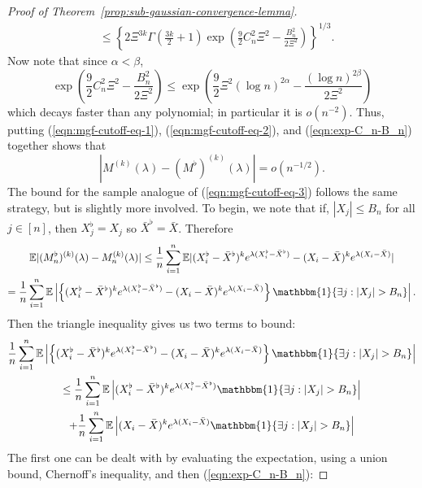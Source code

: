 \documentclass{article}
\theoremstyle{definition}
\newcommand{\E}{\mathbb{E}}
\newcommand{\1}{\mathbbm{1}}
\begin{document}
\begin{proof}[Proof of Theorem~\ref{prop:sub-gaussian-convergence-lemma}]
\begin{align}
        &\leq \left\{2\Xi^{3k}\Gamma\left(\frac{3k}{2}+1\right)\exp\left(\frac92C_n^2\Xi^2-\frac{B_n^2}{2\Xi^2}\right)\right\}^{1/3}. \label{eqn:mgf-cutoff-eq-2}
    \end{align}
    Now note that since $\alpha < \beta$, 
    \begin{equation}
\exp\left(\frac92C_n^2\Xi^2-\frac{B_n^2}{2\Xi^2}\right) \leq  \exp\left(\frac92\Xi^2(\log n)^{2\alpha}-\frac{(\log n)^{2\beta}}{2\Xi^2}\right)
        \label{eqn:exp-C_n-B_n}
    \end{equation}
    which decays faster than any polynomial; in particular it is $o(n^{-2})$. 
    Thus, putting (\ref{eqn:mgf-cutoff-eq-1}), (\ref{eqn:mgf-cutoff-eq-2}), and (\ref{eqn:exp-C_n-B_n}) together shows that 
    \begin{equation}
        |M^{(k)}(\lambda) - (M^\flat)^{(k)}(\lambda)| = o(n^{-1/2}).
        \label{eqn:mgf-cutoff-eq-3}
    \end{equation}
    The bound for the sample analogue of (\ref{eqn:mgf-cutoff-eq-3}) follows the same strategy, but is slightly more involved. To begin, we note that if, $|X_j| \leq B_n$ for all $j \in [n]$, then $X^\flat_j = X_j$ so  $\bar X^\flat = \bar X$. Therefore 
    \begin{multline}
        \E |(M_n^\flat)^{(k)}(\lambda) - M_n^{(k)}(\lambda)|\leq \frac1n\sum_{i=1}^n \E|(X^\flat_i - \bar X^\flat)^ke^{\lambda (X^\flat_i - \bar X^\flat)} - (X_i - \bar X)^ke^{\lambda (X_i - \bar X)}| \\ = \frac1n\sum_{i=1}^n\E\left|\left\{(X^\flat_i - \bar X^\flat)^ke^{\lambda (X^\flat_i - \bar X^\flat)} - (X_i - \bar X)^ke^{\lambda (X_i - \bar X)}\right\} \1\{\exists j:|X_j| > B_n\}\right|.
        \label{eqn:emgf-cutoff-1}
    \end{multline}
    Then the triangle inequality gives us two terms to bound:
    \begin{multline}
        \frac1n\sum_{i=1}^n\E\left|\left\{(X^\flat_i - \bar X^\flat)^ke^{\lambda (X^\flat_i - \bar X^\flat)} - (X_i - \bar X)^ke^{\lambda (X_i - \bar X)}\right\} \1\{\exists j:|X_j| > B_n\}\right| \\
        \leq \frac1n\sum_{i=1}^n \E\left|(X^\flat_i - \bar X^\flat)^ke^{\lambda (X_i^\flat - \bar X^\flat)}\1\{\exists j: |X_j| > B_n\}\right|\\  + \frac1n\sum_{i=1}^n \E\left|(X_i - \bar X)^ke^{\lambda (X_i - \bar X)}\1\{\exists j: |X_j| > B_n\}\right|
        \label{eqn:emgf-cutoff-2}
    \end{multline}
    The first one can be dealt with by evaluating the expectation, using a union bound, Chernoff's inequality, and then (\ref{eqn:exp-C_n-B_n}):

\end{proof}
\end{document}
